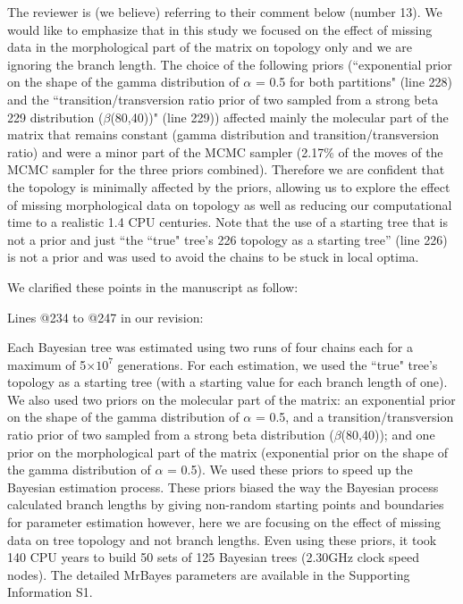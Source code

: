 \documentclass[11pt]{letter}
\begin{document}
\begin{letter}{}
The reviewer is (we believe) referring to their comment below (number 13). We would like to emphasize that in this study we focused on the effect of missing data in the morphological part of the matrix on topology only and we are ignoring the branch length. The choice of the following priors (``exponential prior on the shape of the gamma distribution of $\alpha$ = 0.5 for both partitions" (line 228) and the ``transition/transversion ratio prior of two sampled from a strong beta 229 distribution ($\beta$(80,40))" (line 229)) affected mainly the molecular part of the matrix that remains constant (gamma distribution and transition/transversion ratio) and were a minor part of the MCMC sampler (2.17\% of the moves of the MCMC sampler for the three priors combined). Therefore we are confident that the topology is minimally affected by the priors, allowing us to explore the effect of missing morphological data on topology as well as reducing our computational time to a realistic 1.4 CPU centuries. Note that the use of a starting tree that is not a prior and just ``the ``true" tree's 226 topology as a starting tree'' (line 226) is not a prior and was used to avoid the chains to be stuck in local optima.

We clarified these points in the manuscript as follow:

Lines @234 to @247 in our revision:

\hfill\begin{minipage}{\dimexpr\textwidth-1cm}
Each Bayesian tree was estimated using two runs of four chains each for a maximum of 5$\times$$10^7$ generations. For each estimation, we used the ``true" tree's topology as a starting tree (with a starting value for each branch length of one). We also used two priors on the molecular part of the matrix: an exponential prior on the shape of the gamma distribution of $\alpha$ = 0.5, and a transition/transversion ratio prior of two sampled from a strong beta distribution ($\beta$(80,40)); and one prior on the morphological part of the matrix (exponential prior on the shape of the gamma distribution of $\alpha$ = 0.5). We used these priors to speed up the Bayesian estimation process. These priors biased the way the Bayesian process calculated branch lengths by giving non-random starting points and boundaries for parameter estimation however, here we are focusing on the effect of missing data on tree topology and not branch lengths. Even using these priors, it took $~$ 140 CPU years to build 50 sets of 125 Bayesian trees (2.30GHz clock speed nodes). The detailed MrBayes parameters are available in the Supporting Information S1.
\end{minipage}


\end{letter}
\end{document}

